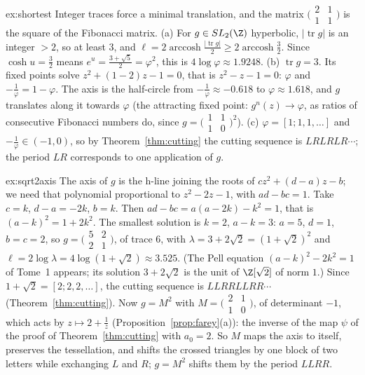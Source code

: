 \begin{solution}{ex:shortest}
\idea Integer traces force a minimal translation, and the matrix $\bigl(\begin{smallmatrix}2&1\\1&1\end{smallmatrix}\bigr)$ is the square of the Fibonacci matrix.
\writeup (a) For $g\in SL_2(\Z)$ hyperbolic, $|\operatorname{tr}g|$ is an integer $>2$, so at least $3$, and $\ell=2\operatorname{arccosh}\frac{|\operatorname{tr}g|}2\ge2\operatorname{arccosh}\frac32$. Since $\cosh u=\frac32$ means $e^u=\frac{3+\sqrt5}2=\varphi^2$,
this is $4\log\varphi\approx1.9248$. (b) $\operatorname{tr}g=3$. Its fixed points solve $z^2+(1-2)z-1=0$, that is $z^2-z-1=0$: $\varphi$ and $-\frac1\varphi=1-\varphi$. The axis is the half-circle from $-\frac1\varphi\approx-0.618$ to
$\varphi\approx1.618$, and $g$ translates along it towards $\varphi$ (the attracting fixed point: $g^n(z)\to\varphi$, as ratios of consecutive Fibonacci numbers do, since $g=\bigl(\begin{smallmatrix}1&1\\1&0\end{smallmatrix}\bigr)^2$).
(c) $\varphi=[1;1,1,\dots]$ and $-\frac1\varphi\in(-1,0)$, so by Theorem~\ref{thm:cutting} the cutting sequence is $LRLRLR\cdots$; the period $LR$ corresponds to one application of $g$.
\end{solution}

\begin{solution}{ex:sqrt2axis}
\idea The axis of $g$ is the h-line joining the roots of $cz^2+(d-a)z-b$; we need that polynomial proportional to $z^2-2z-1$, with $ad-bc=1$.
\writeup Take $c=k$, $d-a=-2k$, $b=k$. Then $ad-bc=a(a-2k)-k^2=1$, that is $(a-k)^2=1+2k^2$. The smallest solution is $k=2$, $a-k=3$: $a=5$, $d=1$, $b=c=2$, so $g=\bigl(\begin{smallmatrix}5&2\\2&1\end{smallmatrix}\bigr)$, of trace
$6$, with $\lambda=3+2\sqrt2=(1+\sqrt2)^2$ and $\ell=2\log\lambda=4\log(1+\sqrt2)\approx3.525$. (The Pell equation $(a-k)^2-2k^2=1$ of Tome~1 appears; its solution $3+2\sqrt2$ is the unit of $\Z[\sqrt2]$ of
norm $1$.) Since $1+\sqrt2=[2;2,2,\dots]$, the cutting sequence is $LLRRLLRR\cdots$ (Theorem~\ref{thm:cutting}). Now $g=M^2$ with $M=\bigl(\begin{smallmatrix}2&1\\1&0\end{smallmatrix}\bigr)$, of determinant $-1$, which acts by
$z\mapsto2+\frac1{\bar z}$ (Proposition~\ref{prop:farey}(a)): the inverse of the map $\psi$ of the proof of Theorem~\ref{thm:cutting} with $a_0=2$. So $M$ maps the axis to itself, preserves the tessellation, and
shifts the crossed triangles by one block of two letters while exchanging $L$ and $R$; $g=M^2$ shifts them by the period $LLRR$.
\end{solution}

